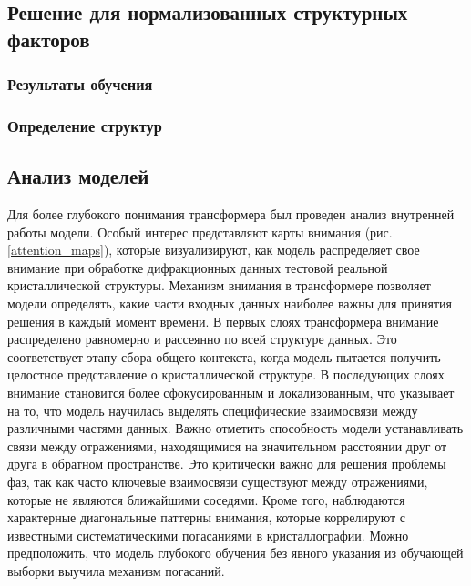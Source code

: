 \subsection{Решение для нормализованных структурных факторов}

\subsubsection{Результаты обучения}

\subsubsection{Определение структур}

\subsection{Анализ моделей}

Для более глубокого понимания трансформера был проведен анализ внутренней работы модели. Особый интерес представляют карты внимания (рис. \ref{attention_maps}), которые визуализируют, как модель распределяет свое внимание при обработке дифракционных данных тестовой реальной кристаллической структуры. Механизм внимания в трансформере позволяет модели определять, какие части входных данных наиболее важны для принятия решения в каждый момент времени. В первых слоях трансформера внимание распределено равномерно и рассеянно по всей структуре данных. Это соответствует этапу сбора общего контекста, когда модель пытается получить целостное представление о кристаллической структуре. В последующих слоях внимание становится более сфокусированным и локализованным, что указывает на то, что модель научилась выделять специфические взаимосвязи между различными частями данных. Важно отметить способность модели устанавливать связи между отражениями, находящимися на значительном расстоянии друг от друга в обратном пространстве. Это критически важно для решения проблемы фаз, так как часто ключевые взаимосвязи существуют между отражениями, которые не являются ближайшими соседями. Кроме того, наблюдаются характерные диагональные паттерны внимания, которые коррелируют с известными систематическими погасаниями в кристаллографии. Можно предположить, что модель глубокого обучения без явного указания из обучающей выборки выучила механизм погасаний.

